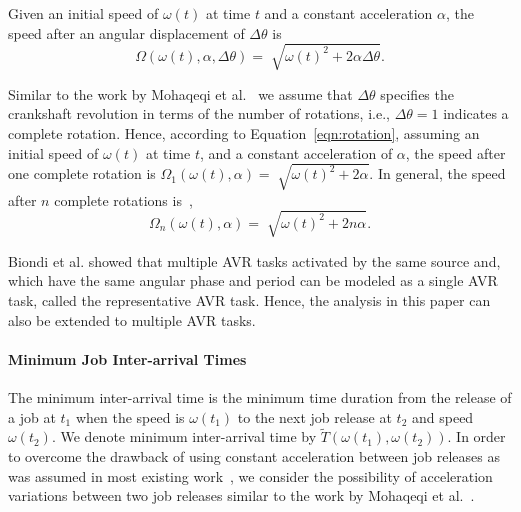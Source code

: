 \begin{property}
Given an initial speed of $\omega(t)$ at time $t$ and a constant acceleration $\alpha$,
the speed after an angular displacement of $\Delta \theta$
is~\cite{verma_concepts_nodate, biondi_exact_2014}
\begin{equation}
\label{eqn:rotation}
    \Omega(\omega(t),\alpha, \Delta \theta) = \sqrt[]{\omega(t)^2+2\alpha \Delta \theta}.
\end{equation}

Similar to the work by Mohaqeqi et al.~\cite{mohaqeqi_refinement_2017} we assume that $\Delta \theta$ specifies the crankshaft revolution in terms of the number of rotations, i.e., $ \Delta \theta = 1$ indicates a complete rotation.
Hence, according to Equation~\ref{eqn:rotation}, assuming an initial speed of $\omega(t)$ at time $t$, and a constant acceleration of $\alpha$, the speed after one complete rotation is $\Omega_1(\omega(t),\alpha) = \sqrt[]{\omega(t)^2+2\alpha}$.
In general, the speed after $n$ complete rotations is~\cite{mohaqeqi_refinement_2017},
\begin{equation}
\label{eqn:rotation-n}
    \Omega_n(\omega(t),\alpha) = \sqrt[]{\omega(t)^2+2 n \alpha}.
\end{equation}
\end{property}


Biondi et al. \cite{biondi_response-time_2015} showed that multiple AVR tasks activated by the same source and, which have the same angular phase and period can be modeled as a single AVR task, called the representative AVR task.
Hence, the analysis in this paper can also be extended to multiple AVR tasks.


\paragraph{Minimum Job Inter-arrival Times}

The minimum inter-arrival time is the minimum time duration from the release of a job at $t_1$ when the speed is $\omega(t_1)$ to the next job release at $t_2$ and speed $\omega(t_2)$. We denote minimum inter-arrival time by $\widetilde{T}(\omega(t_1),\omega(t_2))$.
In order to overcome the drawback of using constant acceleration between job releases as was assumed in most existing work~\cite{biondi_response-time_2015,biondi_feasibility_2015,biondi_exact_2014}, we consider the possibility of acceleration variations between two job releases similar to the work by Mohaqeqi et al.~\cite{mohaqeqi_refinement_2017}.

